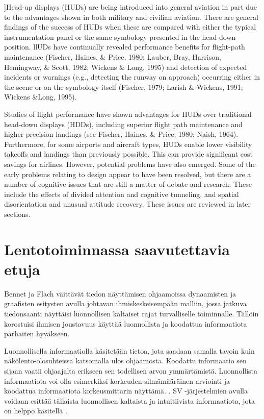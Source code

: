 \documentclass[utf8,bachelor,manualbib]{gradu3}
\begin{document}
]Head-up displays (HUDs) are being introduced into general aviation in part due to
the advantages shown in both military and civilian aviation. There are general
findings of the success of HUDs when these are compared with either the typical
instrumentation panel or the same symbology presented in the head-down position.
llUDs have continually revealed performance benefits for flight-path maintenance
(Fischer, Haines, \& Price, 1980; Lauber, Bray, Harrison, Hemingway, \& Scott, 1982; Wickens \& Long, 1995) and detection of expected incidents or warnings
(e.g., detecting the runway on approach) occurring either in the scene or on the
symbology itself (Fischer, 1979; Larish \& Wickens, 1991; Wickens \&Long, 1995).

Studies of flight performance have shown advantages for HUDs over traditional
head-down displays (HDDs), including superior flight path maintenance
and higher precision landings (see Fischer, Haines, \& Price, 1980; Naish, 1964).
Furthermore, for some airports and aircraft types, HUDs enable lower visibility
takeoffs and landings than previously possible. This can provide significant cost
savings for airlines. However, potential problems have also emerged. Some of the
early problems relating to design appear to have been resolved, but there are a
number of cognitive issues that are still a matter of debate and research. These include
the effects of divided attention and cognitive tunneling, and spatial disorientation
and unusual attitude recovery. These issues are reviewed in later sections. \citep{crawford2006}

\section{Lentotoiminnassa saavutettavia etuja}

Bennet ja Flach \citeyearpar{bennetflach1994} väittävät tiedon näyttämisen ohjaamoissa dynaamisten ja graafisten esitysten avulla johtavan ihmiskeskeisempään malliin, jossa jatkuva tiedonsaanti näyttäisi luonnollisen kaltaiset rajat turvalliselle toiminnalle. Tällöin korostuisi ihmisen joustavuus käyttää luonnollista ja koodattua informaatiota parhaiten hyväkseen.

Luonnollisella informaatiolla käsitetään tietoa, jota saadaan samalla tavoin kuin näkölento-olosuhteissa katsomalla ulos ohjaamosta. Koodattu informaatio sen sijaan vaatii ohjaajalta erikseen sen todellisen arvon ymmärtämistä. Luonnollista informaatiota voi olla esimerkiksi korkeuden silmämääräinen arviointi ja koodattua informaatiota korkeusmittarin näyttämä. \citep{prinzel2004}. SV -järjestelmien avulla voidaan esittää tällaista luonnollisen kaltaista ja intuitiivista informaatiota, jota on helppo käsitellä \citep{wickensandre1990}.
\end{document}
